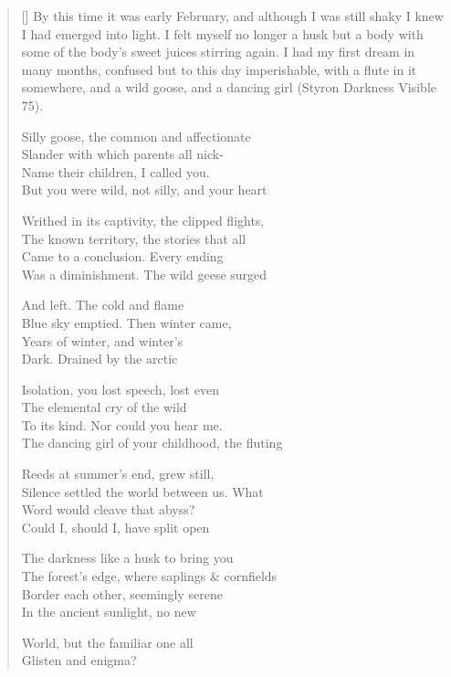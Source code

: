 \settowidth{\versewidth}{The forest's edge, where saplings \& cornfields}
\begin{verse}[\versewidth]
By this time it was early February, and although I was still shaky I knew I had emerged into light. I felt myself no longer a husk but a body with some of the body's sweet juices stirring again. I had my first dream in many months, confused but to this day imperishable, with a flute in it somewhere, and a wild goose, and a dancing girl (Styron Darkness Visible 75).

Silly goose, the common and affectionate\\
Slander with which parents all nick-\\
Name their children, I called you.\\
But you were wild, not silly, and your heart

Writhed in its captivity, the clipped flights,\\
The known territory, the stories that all\\
Came to a conclusion. Every ending\\
Was a diminishment. The wild geese surged

And left. The cold and flame\\
Blue sky emptied.  Then winter came,\\
Years of winter, and winter's\\
Dark. Drained by the arctic

Isolation, you lost speech, lost even\\
The elemental cry of the wild\\
To its kind. Nor could you hear me.\\
The dancing girl of your childhood, the fluting

Reeds at summer's end, grew still,\\
Silence settled the world between us. What\\
Word would cleave that abyss?\\
Could I, should I, have split open

The darkness like a husk to bring you\\
The forest's edge, where saplings \& cornfields\\
Border each other, seemingly serene\\
In the ancient sunlight, no new

World, but the familiar one all\\
Glisten and enigma?
\end{verse}
